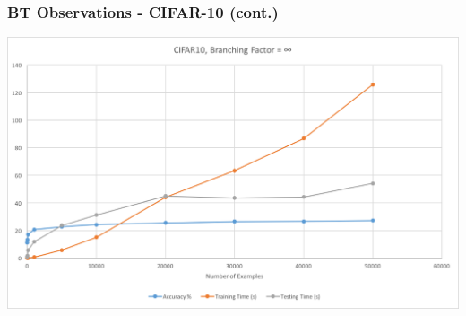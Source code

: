 \documentclass[pdf]{beamer}
\begin{document}
	\begin{frame}
		\frametitle{BT Observations - CIFAR-10 (cont.)}
		\includegraphics[scale=0.5]{Graphics/CIFAR_kinf}
	\end{frame}

\end{document}
